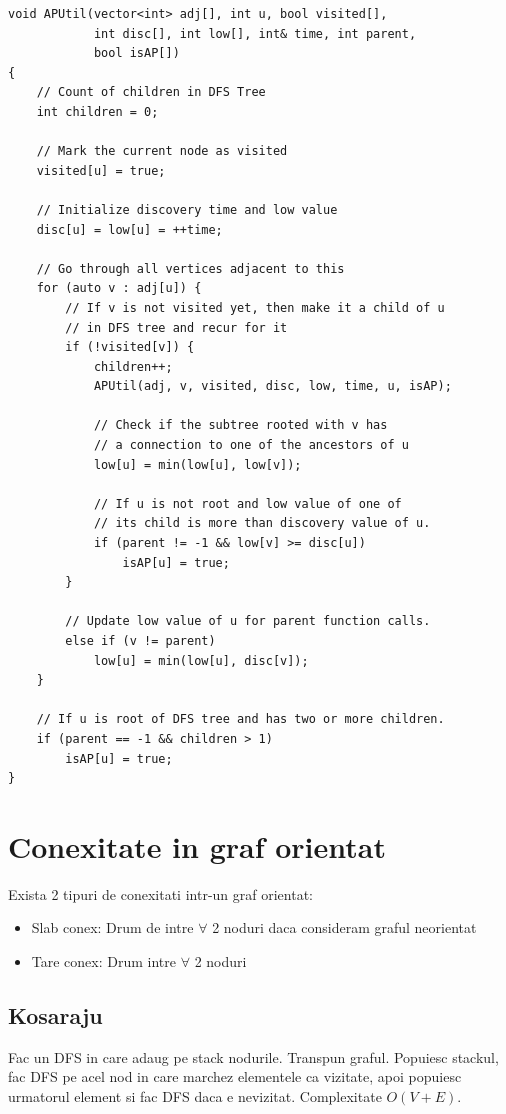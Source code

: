 \documentclass{article}
\begin{document}
    \begin{lstlisting}
void APUtil(vector<int> adj[], int u, bool visited[],
            int disc[], int low[], int& time, int parent,
            bool isAP[])
{
    // Count of children in DFS Tree
    int children = 0;
 
    // Mark the current node as visited
    visited[u] = true;
 
    // Initialize discovery time and low value
    disc[u] = low[u] = ++time;
 
    // Go through all vertices adjacent to this
    for (auto v : adj[u]) {
        // If v is not visited yet, then make it a child of u
        // in DFS tree and recur for it
        if (!visited[v]) {
            children++;
            APUtil(adj, v, visited, disc, low, time, u, isAP);
 
            // Check if the subtree rooted with v has
            // a connection to one of the ancestors of u
            low[u] = min(low[u], low[v]);
 
            // If u is not root and low value of one of
            // its child is more than discovery value of u.
            if (parent != -1 && low[v] >= disc[u])
                isAP[u] = true;
        }
 
        // Update low value of u for parent function calls.
        else if (v != parent)
            low[u] = min(low[u], disc[v]);
    }
 
    // If u is root of DFS tree and has two or more children.
    if (parent == -1 && children > 1)
        isAP[u] = true;
}
    \end{lstlisting}

    \section{Conexitate in graf orientat} Exista 2 tipuri de conexitati intr-un graf orientat:
    \begin{itemize}
        \item Slab conex: Drum de intre $\forall$ 2 noduri daca consideram graful neorientat
        \item Tare conex: Drum intre $\forall$ 2 noduri
    \end{itemize}

    \subsection*{Kosaraju} Fac un DFS in care adaug pe stack nodurile. Transpun graful. Popuiesc stackul, fac DFS pe acel nod in care marchez elementele ca vizitate, apoi popuiesc urmatorul element si fac DFS daca e nevizitat. Complexitate $O(V+E)$.
\end{document}
